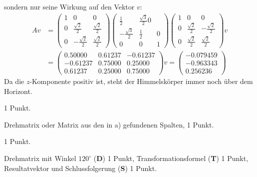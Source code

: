 \begin{loesung}
\begin{teilaufgaben}
sondern nur seine Wirkung auf den Vektor $v$:
\begin{align*}
Av&=
\begin{pmatrix}
1& 0                  & 0                 \\
0& \frac{\sqrt{2}}2   & \frac{\sqrt{2}}2  \\
0&-\frac{\sqrt{2}}2   & \frac{\sqrt{2}}2
\end{pmatrix}
\begin{pmatrix}
 \frac12          & \frac{\sqrt{3}}2 0\\
-\frac{\sqrt{3}}2 & \frac12        & 0\\
 0                & 0              & 1
\end{pmatrix}
\begin{pmatrix}
1& 0                 & 0                 \\
0& \frac{\sqrt{2}}2  &-\frac{\sqrt{2}}2  \\
0& \frac{\sqrt{2}}2  & \frac{\sqrt{2}}2  
\end{pmatrix}v
\\
&=
\begin{pmatrix}
   0.50000 & 0.61237& -0.61237\\
  -0.61237 & 0.75000&  0.25000\\
   0.61237 & 0.25000&  0.75000
\end{pmatrix}v
=\begin{pmatrix}
  -0.079459\\
  -0.963343\\
   0.256236
\end{pmatrix}
\end{align*}
Da die $z$-Komponente positiv ist, steht der Himmelskörper immer noch
über dem Horizont.
\qedhere
\end{teilaufgaben}
\end{loesung}

\begin{bewertung}
\begin{teilaufgaben}
\item 1 Punkt.
\item Drehmatrix oder Matrix aus den in a) gefundenen Spalten, 1 Punkt.
\item 1 Punkt.
\item Drehmatrix mit Winkel $120^\circ$ ({\bf D}) 1 Punkt,
Transformationsformel ({\bf T}) 1 Punkt,
Resultatvektor und Schlussfolgerung ({\bf S}) 1 Punkt.
\end{teilaufgaben}
\end{bewertung}

